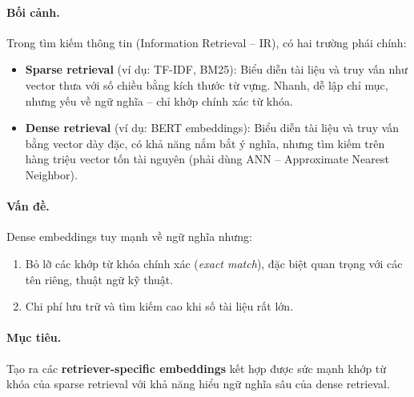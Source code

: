 \paragraph{Bối cảnh.}
Trong tìm kiếm thông tin (Information Retrieval – IR), có hai trường phái chính:
\begin{itemize}
	\item \textbf{Sparse retrieval} (ví dụ: TF-IDF, BM25): Biểu diễn tài liệu và truy vấn như vector thưa với số chiều bằng kích thước từ vựng. Nhanh, dễ lập chỉ mục, nhưng yếu về ngữ nghĩa – chỉ khớp chính xác từ khóa.
	\item \textbf{Dense retrieval} (ví dụ: BERT embeddings): Biểu diễn tài liệu và truy vấn bằng vector dày đặc, có khả năng nắm bắt ý nghĩa, nhưng tìm kiếm trên hàng triệu vector tốn tài nguyên (phải dùng ANN – Approximate Nearest Neighbor).
\end{itemize}

\paragraph{Vấn đề.}
Dense embeddings tuy mạnh về ngữ nghĩa nhưng:
\begin{enumerate}
	\item Bỏ lỡ các khớp từ khóa chính xác (\textit{exact match}), đặc biệt quan trọng với các tên riêng, thuật ngữ kỹ thuật.
	\item Chi phí lưu trữ và tìm kiếm cao khi số tài liệu rất lớn.
\end{enumerate}

\paragraph{Mục tiêu.}
Tạo ra các \textbf{retriever-specific embeddings} kết hợp được sức mạnh khớp từ khóa của sparse retrieval với khả năng hiểu ngữ nghĩa sâu của dense retrieval.

